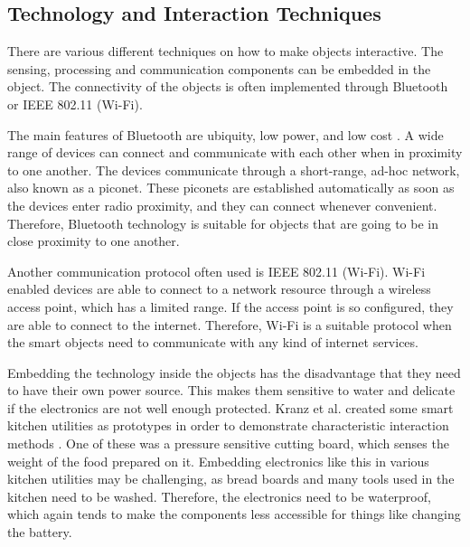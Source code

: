 \subsection{Technology and Interaction Techniques}
\label{sec:techniques}
There are various different techniques on how to make objects interactive. 
The sensing, processing and communication components can be embedded in the object.
The connectivity of the objects is often implemented through Bluetooth \cite{bluetoothPatent} or IEEE 802.11 (Wi-Fi).

The main features of Bluetooth are ubiquity, low power, and low cost \cite{btbasics}.
A wide range of devices can connect and communicate with each other when in proximity to one another.
The devices communicate through a short-range, ad-hoc network, also known as a piconet.
These piconets are established automatically as soon as the devices enter radio proximity, and they can connect whenever convenient.
Therefore, Bluetooth technology is suitable for objects that are going to be in close proximity to one another. 

Another communication protocol often used is IEEE 802.11 (Wi-Fi).
Wi-Fi enabled devices are able to connect to a network resource through a wireless access point, which has a limited range.
If the access point is so configured, they are able to connect to the internet.
Therefore, Wi-Fi is a suitable protocol when the smart objects need to communicate with any kind of internet services.

Embedding the technology inside the objects has the disadvantage that they need to have their own power source.
This makes them sensitive to water and delicate if the electronics are not well enough protected.
Kranz et al. created some smart kitchen utilities as prototypes in order to demonstrate characteristic interaction methods \cite{kranz10}. 
One of these was a pressure sensitive cutting board, which senses the weight of the food prepared on it. 
Embedding electronics like this in various kitchen utilities may be challenging, as bread boards and many tools used in the kitchen need to be washed. 
Therefore, the electronics need to be waterproof, which again tends to make the components less accessible for things like changing the battery.

